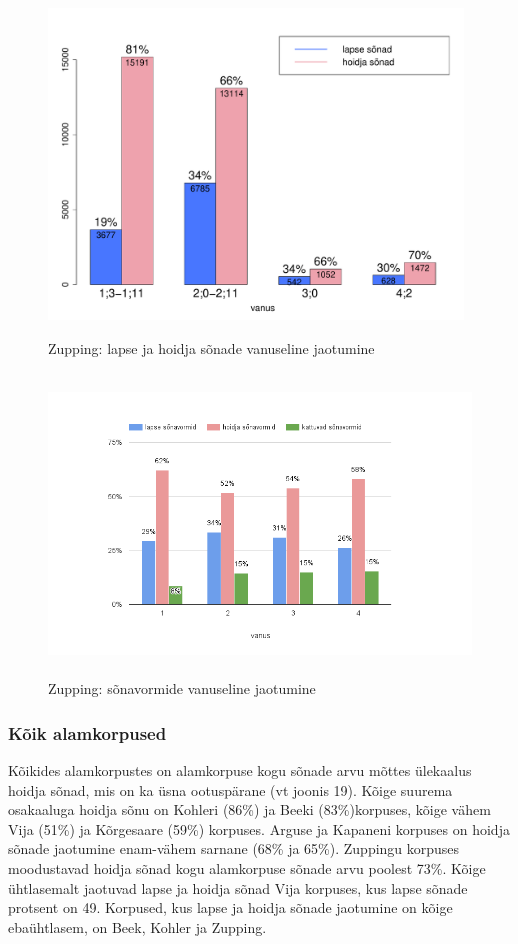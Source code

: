 \documentclass[12pt]{article}
\begin{document}
\begin{figure}[H]
    \centering
    \includegraphics[width=11cm, height=9cm]{zupping_vanus_sonad}
    \caption{Zupping: lapse ja hoidja sõnade vanuseline jaotumine}
\end{figure}


\begin{figure}[H]
    \centering
    \includegraphics[width=13cm, height=8cm]{zupping_vanus_vormid}
    \caption{Zupping: sõnavormide vanuseline jaotumine}
\end{figure}



\subsubsection{Kõik alamkorpused}

Kõikides alamkorpustes on alamkorpuse kogu sõnade arvu mõttes ülekaalus hoidja sõnad, mis on ka üsna ootuspärane (vt joonis 19). Kõige suurema osakaaluga hoidja sõnu on Kohleri (86\%) ja Beeki (83\%)korpuses, kõige vähem Vija (51\%) ja Kõrgesaare (59\%) korpuses. Arguse ja Kapaneni korpuses on hoidja sõnade jaotumine enam-vähem sarnane (68\% ja 65\%). Zuppingu korpuses moodustavad hoidja sõnad kogu alamkorpuse sõnade arvu poolest 73\%. Kõige ühtlasemalt jaotuvad lapse ja hoidja sõnad Vija korpuses, kus lapse sõnade protsent on 49. Korpused, kus lapse ja hoidja sõnade jaotumine on kõige ebaühtlasem, on Beek, Kohler ja Zupping. 
\end{document}

